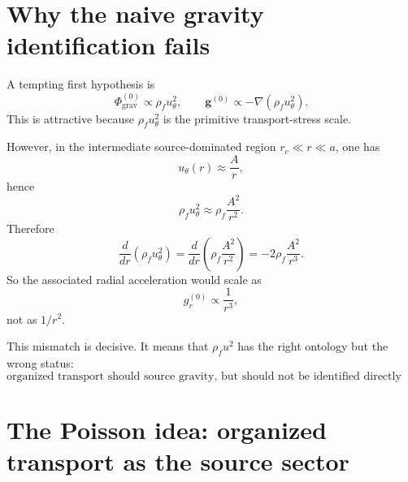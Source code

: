 \documentclass[11pt]{article}
\newcommand{\rhoF}{\rho_{\!f}}
\newcommand{\rc}{r_c}
\newcommand{\grav}{\mathrm{grav}}
\begin{document}
        \section{Why the naive gravity identification fails}
        
        A tempting first hypothesis is
        \begin{equation}
            \Phi_{\grav}^{(0)} \propto \rhoF u_\theta^2,
            \qquad
            \mathbf{g}^{(0)} \propto -\nabla\!\left(\rhoF u_\theta^2\right).
            \label{eq:naive-hypothesis}
        \end{equation}
        This is attractive because \(\rhoF u_\theta^2\) is the primitive transport-stress scale.
        
        However, in the intermediate source-dominated region \(\rc \ll r \ll a\), one has
        \begin{equation}
            u_\theta(r)\approx \frac{A}{r},
            \label{eq:u-mid}
        \end{equation}
        hence
        \begin{equation}
            \rhoF u_\theta^2 \approx \rhoF \frac{A^2}{r^2}.
            \label{eq:rho-u2-mid}
        \end{equation}
        Therefore
        \begin{equation}
            \frac{d}{dr}\left(\rhoF u_\theta^2\right)
            =
            \frac{d}{dr}\left(\rhoF \frac{A^2}{r^2}\right)
            =
            -2\rhoF \frac{A^2}{r^3}.
            \label{eq:dr-rhou2}
        \end{equation}
        So the associated radial acceleration would scale as
        \begin{equation}
            g_r^{(0)} \propto \frac{1}{r^3},
            \label{eq:g-r3}
        \end{equation}
        not as \(1/r^2\).
        
        This mismatch is decisive. It means that \(\rhoF u^2\) has the right ontology but the wrong status:
        \begin{equation}
            \boxed{
                \text{organized transport should source gravity, but should not be identified directly with the gravity field.}
            }
            \label{eq:source-not-field}
        \end{equation}
        
        \section{The Poisson idea: organized transport as the source sector}
        
\end{document}
